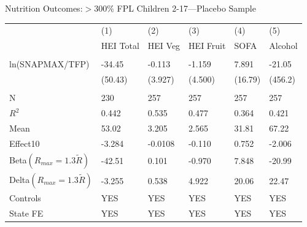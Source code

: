 \documentclass{beamer}
\begin{document}
\begin{frame}
\begin{table}{Nutrition Outcomes:$>300\%$ FPL Children 2-17---Placebo Sample}
\begin{adjustbox}{max width=\textwidth}

\begin{tabular}{llllll}
\toprule
 & (1) & (2) & (3) & (4) & (5) \\
 & HEI Total & HEI Veg & HEI Fruit & SOFA & Alcohol \\
 \midrule
 \\
ln(SNAPMAX/TFP) & -34.45 & -0.113 & -1.159 & 7.891 & -21.05 \\
 & (50.43) & (3.927) & (4.500) & (16.79) & (456.2) \\
 \\
 N & 230 & 257 & 257 & 257 & 257 \\
$R^2$ & 0.442 & 0.535 & 0.477 & 0.364 & 0.421 \\
Mean & 53.02 & 3.205 & 2.565 & 31.81 & 67.22 \\
Effect10 & -3.284 & -0.0108 & -0.110 & 0.752 & -2.006 \\
Beta$(R_{max}=1.3\tilde{R})$  & -42.51 & 0.101 & -0.970 & 7.848 & -20.99 \\
Delta$(R_{max}=1.3\tilde{R})$  & -3.255 & 0.538 & 4.922 & 20.06 & 22.47 \\
Controls & YES & YES & YES & YES & YES \\
State FE & YES & YES & YES & YES & YES \\
\bottomrule
\end{tabular}


\end{adjustbox}
\end{table}
\end{frame}
\end{document}
